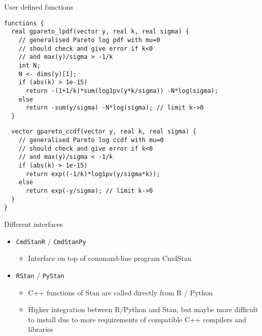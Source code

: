 \documentclass[finnish,english,t]{beamer}
\begin{document}
\begin{frame}[fragile]{User defined functions}
  
  \vspace{-.75\baselineskip}
  {\footnotesize
    {
  \begin{verbatim}
functions {
  real gpareto_lpdf(vector y, real k, real sigma) {
    // generalised Pareto log pdf with mu=0
    // should check and give error if k<0 
    // and max(y)/sigma > -1/k
    int N;
    N <- dims(y)[1];
    if (abs(k) > 1e-15)
      return -(1+1/k)*sum(log1pv(y*k/sigma)) -N*log(sigma);
    else
      return -sum(y/sigma) -N*log(sigma); // limit k->0
  }
\end{verbatim}
    }
    \vspace{-1.25\baselineskip}
    {
\begin{verbatim}
  vector gpareto_ccdf(vector y, real k, real sigma) {
    // generalised Pareto log ccdf with mu=0
    // should check and give error if k<0 
    // and max(y)/sigma < -1/k
    if (abs(k) > 1e-15)
      return exp((-1/k)*log1pv(y/sigma*k));
    else
      return exp(-y/sigma); // limit k->0
  }
}
  \end{verbatim}
    }
    }
\end{frame} 

\begin{frame}{Different interfaces}

  \begin{itemize}
  \item \texttt{CmdStanR} / \texttt{CmdStanPy}
    \begin{itemize}
    \item Interface on top of command-line program CmdStan
    \end{itemize}
  \item \texttt{RStan} / \texttt{PyStan}
    \begin{itemize}
    \item C++ functions of Stan are called directly from R / Python
    \item Higher integration between R/Python and Stan, but maybe more
      difficult to install due to more requirements of compatible C++
      compilers and libraries
    \end{itemize}
  \end{itemize}

\end{frame} 
\end{document}
